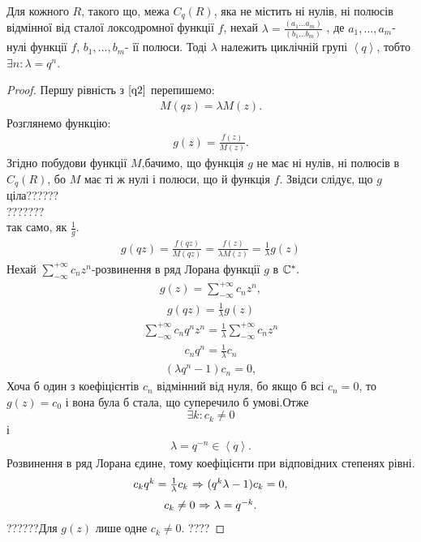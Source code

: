 \documentclass[12pt,a4paper]{article}
\begin{document}
\begin{thm}
Для кожного $R$, такого що, межа $C_{q}(R)$, яка не містить ні нулів, ні полюсів відмінної від сталої локсодромної функції $f$, нехай $\lambda=\frac{(a_{1}...a_{m})}{(b_{1}...b_{m})}$ , де $a_{1},...,a_{m}$- нулі функції $f$, $b_{1},...,b_{m}$- її полюси. Тоді $\lambda$ належить циклічній групі $\left \langle q \right \rangle$, тобто $ \exists n:\lambda =q^{n}$.
\end{thm}
\begin{proof}
Першу рівність з $\eqref{q2}$ перепишемо:
\[\begin{array}{l}
 M(qz)=\lambda M(z).
 \end{array}\]
 Розглянемо функцію:
 \[\begin{array}{l}
 g(z)=\frac{f(z)}{M(z)}.
  \end{array}\]
  Згідно побудови функції $M$,бачимо, що функція $g$ не має ні нулів, ні полюсів в $C_{q}(R)$, бо $M$ має ті ж нулі і полюси, що й функція $f$. Звідси слідує, що $g$ ціла??????\\
   ???????\\
   так само, як $\frac{1}{g}$.
\begin{equation}\label{th41}
\begin{array}{l}
g(qz)=\frac{f(qz)}{M(qz)}=\frac{f(z)}{\lambda M(z)}=\frac{1}{\lambda}g(z)
\end{array}
\end{equation}
Нехай $\sum\limits_{-\infty}^{+\infty}c_{n}z^{n}$-розвинення в ряд Лорана функції $g$ в $\mathbb{C}^{*}.\\$
 \[\begin{array}{l}
g(z)=\sum\limits_{-\infty}^{+\infty}c_{n}z^{n},
 \end{array}\]
 \[\begin{array}{l}
 g(qz)=\frac{1}{\lambda}g(z)
 \end{array}\]
 \[\begin{array}{l}
 \sum\limits_{-\infty}^{+\infty}c_{n}q^{n}z^{n}=\frac{1}{\lambda}\sum\limits_{-\infty}^{+\infty}c_{n}z^{n}
  \end{array}\]
 \[\begin{array}{l} 
c_{n}q^{n}=\frac{1}{\lambda}c_{n} 
  \end{array}\] 
   \[\begin{array}{l}
 (\lambda q^{n}-1)c_{n}=0,
  \end{array}\]
Хоча б один з коефіцієнтів $c_{n}$ відмінний від нуля, бо якщо б всі $c_{n}=0$, то $g(z)=c_{0}$ і вона була б стала, що суперечило б умові.Отже 
$$\exists k: c_{k}\neq 0$$ 
і 
 \[\begin{array}{l} 
 \lambda= q^{-n}\in \left \langle q \right \rangle .
 \end{array}\]
Розвинення в ряд Лорана єдине, тому коефіцієнти при відповідних степенях рівні.
\[\begin{array}{l}
c_{k}q^{k}=\frac{1}{\lambda} c_{k}$ $\Rightarrow$ $(q^{k}\lambda -1)c_{k}=0,
 \end{array}\]
\[\begin{array}{l}
c_{k}\neq 0$ $\Rightarrow$  $\lambda=q^{-k}.
 \end{array}\]
??????Для $g(z)$ лише одне $ c_{k}\neq 0$. ????
\end{proof}
\end{document}
